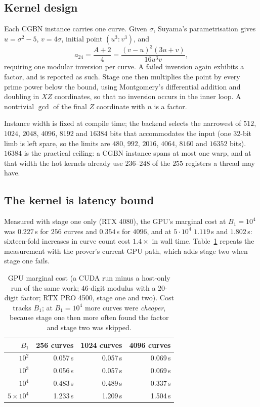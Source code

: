 \documentclass[11pt,a4paper]{article}
\begin{document}
\subsection{Kernel design}

Each CGBN instance carries one curve. Given $\sigma$, Suyama's
parametrisation gives $u = \sigma^2 - 5$, $v = 4\sigma$, initial point
$(u^3 : v^3)$, and
\[
  a_{24} = \frac{A+2}{4} = \frac{(v-u)^3(3u+v)}{16u^3v},
\]
requiring one modular inversion per curve. A failed inversion again
exhibits a factor, and is reported as such. Stage one then multiplies the
point by every prime power below the bound, using Montgomery's
differential addition and doubling in $XZ$ coordinates, so that no
inversion occurs in the inner loop. A nontrivial $\gcd$ of the final $Z$
coordinate with $n$ is a factor.

Instance width is fixed at compile time; the backend selects the
narrowest of $512$, $1024$, $2048$, $4096$, $8192$ and $16384$ bits that accommodates the input
(one $32$-bit limb is left spare, so the limits are $480$, $992$, $2016$, $4064$, $8160$ and
$16352$ bits). $16384$ is the practical ceiling: a CGBN instance spans at most one warp, and at
that width the hot kernels already use $236$--$248$ of the $255$ registers a thread may have.

\subsection{The kernel is latency bound}

Measured with stage one only (RTX 4080), the GPU's marginal cost at $B_1 = 10^4$
was $0.227$\,s for $256$ curves and $0.354$\,s for $4096$, and at $5\cdot10^4$
$1.119$\,s and $1.802$\,s: sixteen-fold increases in curve count cost $1.4\times$ in
wall time. Table~\ref{tab:kernel} repeats the measurement with the prover's current GPU
path, which adds stage two when stage one fails.

\begin{table}[t]
\centering
\begin{tabular}{rrrr}
\toprule
$B_1$ & 256 curves & 1024 curves & 4096 curves \\
\midrule
$10^2$ & 0.057\,s & 0.057\,s & 0.069\,s \\
$10^3$ & 0.056\,s & 0.057\,s & 0.069\,s \\
$10^4$ & 0.483\,s & 0.489\,s & 0.337\,s \\
$5\times10^4$ & 1.233\,s & 1.209\,s & 1.504\,s \\
\bottomrule
\end{tabular}
\caption{GPU marginal cost (a CUDA run minus a host-only run of the same work; 46-digit
  modulus with a 20-digit factor; RTX PRO 4500, stage one and two). Cost tracks $B_1$;
  at $B_1 = 10^4$ more curves were \emph{cheaper}, because stage one then more often found
  the factor and stage two was skipped.}
\label{tab:kernel}
\end{table}
\end{document}
